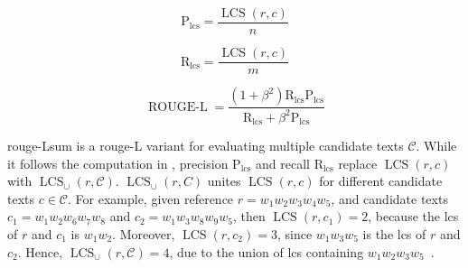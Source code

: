 \begin{equation}
\mathrm{P_{lcs}} = \frac{\operatorname{LCS}(r,c)}{n}
\label{eq:rouge_l_precision}
\end{equation}

\begin{equation}
\mathrm{R_{lcs}} = \frac{\operatorname{LCS}(r,c)}{m}
\label{eq:rouge_l_recall}
\end{equation}

\begin{equation}
\operatorname{ROUGE-L} = \frac{(1 + \beta^2)  \mathrm{R_{lcs}}  \mathrm{P_{lcs}}}{\mathrm{R_{lcs}} + \beta^2  \mathrm{P_{lcs}}}
\label{eq:rouge_l}
\end{equation}

\ac{rouge}-Lsum is a \ac{rouge}-L variant for evaluating multiple candidate texts $\mathcal{C}$.
While it follows the computation in , precision $\mathrm{P_{lcs}}$ and recall $\mathrm{R_{lcs}}$ replace $\operatorname{LCS}(r,c)$ with $\operatorname{LCS}_\cup(r,\mathcal{C})$.
$\operatorname{LCS}_\cup(r,C)$ unites $\operatorname{LCS}(r,c)$ for different candidate texts $c \in \mathcal{C}$.
For example, given reference $r=w_1 w_2 w_3 w_4 w_5$, and candidate texts $c_1 = w_1 w_2 w_6 w_7 w_8$ and $c_2 = w_1 w_3 w_8 w_9 w_5$, then $\operatorname{LCS}(r,c_1)=2$, because the \ac{lcs} of $r$ and $c_1$ is $w_1 w_2$.
Moreover, $\operatorname{LCS}(r,c_2)=3$, since $w_1 w_3 w_5$ is the \ac{lcs} of $r$ and $c_2$.
Hence, $\operatorname{LCS}_\cup(r,\mathcal{C})=4$, due to the union of \ac{lcs} containing $w_1 w_2 w_3 w_5$~\citep{lin_rouge_2004}.

